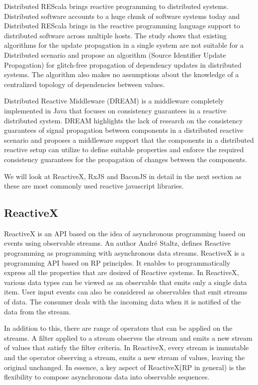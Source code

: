 Distributed REScala\cite{Drechsler:2014:DRU:2660193.2660240} brings reactive programming to distributed systems. Distributed software accounts to a huge chunk of software systems today and Distributed REScala brings in the reactive programming language support to distributed software across multiple hosts. The study\cite{Drechsler:2014:DRU:2660193.2660240} shows that existing algorithms for the update propagation in a single system are not suitable for a Distributed scenario and propose an algorithm (Source Identifier Update Propagation) for glitch-free propagation of dependency updates in distributed systems. The algorithm also makes no assumptions about the knowledge of a centralized topology of dependencies between values.

Distributed Reactive Middleware (DREAM) \cite{Margara:2014:WDD:2611286.2611290} is a middleware completely implemented in Java that focuses on consistency guarantees in a reactive distributed system. DREAM highlights the lack of research on the consistency guarantees of signal propagation between components in a distributed reactive scenario and proposes a middleware support that the components in a distributed reactive setup can utilize to define suitable properties and enforce the required consistency guarantees for the propagation of changes between the components.

We will look at ReactiveX, RxJS and BaconJS in detail in the next section as these are most commonly used reactive javascript libraries.

\subsection{ReactiveX}
ReactiveX is an API based on the idea of asynchronous programming based on events using observable streams. An author André Staltz, defines Reactive programming as programming with asynchronous data streams\cite{introToRP}. ReactiveX is a programming API based on RP principles. It enables to programmatically express \cite{Doblander:2015:GEA:2675743.2776757} all the properties that are desired of Reactive systems\cite{reactiveManifesto}. In ReactiveX, various data types can be viewed as an observable that emits only a single data item. User input events can also be considered as observables that emit streams of data. The consumer deals with the incoming data when it is notified of the data from the stream.

In addition to this, there are range of operators that can be applied on the streams. A filter applied to a stream observes the stream and emits a new stream of values that satisfy the filter criteria. In ReactiveX, every stream is immutable and the operator observing a stream, emits a new stream of values, leaving the original unchanged. In essence, a key aspect of ReactiveX(RP in general) is the flexibility to compose \cite{Meyerovich:2009:FPL:1639949.1640091} asynchronous data into observable sequences.

